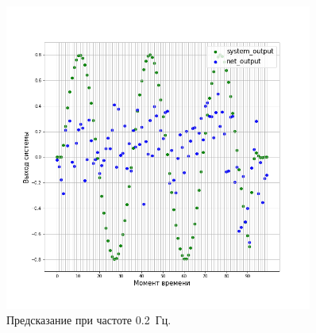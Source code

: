 \documentclass[12pt, oneside]{extbook}
\begin{document}
\begin{flushleft}
\begin{figure}[h]
\centering
\includegraphics[width=0.9\textwidth]{fcnet_prediction_shifted}
\caption{Предсказание при частоте 0.2~Гц.}
\label{fig:multi_prediction_shifted}
\end{figure}


\end{flushleft}
\end{document}
